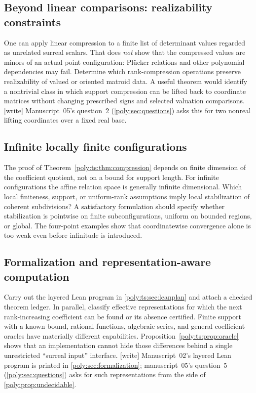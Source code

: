 \documentclass[11pt,a4paper]{article}
\numberwithin{equation}{section}
\theoremstyle{plain}
\newcommand{\wtag}{\textup{[write]}}%
\begin{document}
\subsection{Beyond linear comparisons: realizability constraints}
One can apply linear compression to a finite list of determinant values
regarded as unrelated surreal scalars. That does \emph{not} show that
the compressed values are minors of an actual point configuration:
Pl\"ucker relations and other polynomial dependencies may fail.
Determine which rank-compression operations preserve realizability of
valued or oriented matroid data. A useful theorem would identify a
nontrivial class in which support compression can be lifted back to
coordinate matrices without changing prescribed signs and selected
valuation comparisons.
\wtag{} Manuscript~05's question~2 (\cref{poly:sec:questions}) asks this for
two nonreal lifting coordinates over a fixed real base.

\subsection{Infinite locally finite configurations}
The proof of Theorem~\ref{poly:ts:thm:compression} depends on finite dimension of
the coefficient quotient, not on a bound for support length. For infinite
configurations the affine relation space is generally infinite dimensional.
Which local finiteness, support, or uniform-rank assumptions imply local
stabilization of coherent subdivisions? A satisfactory formulation should
specify whether stabilization is pointwise on finite subconfigurations,
uniform on bounded regions, or global. The four-point examples show that
coordinatewise convergence alone is too weak even before infinitude is
introduced.

\subsection{Formalization and representation-aware computation}
Carry out the layered Lean program in \cref{poly:ts:sec:leanplan} and
attach a checked theorem ledger. In parallel, classify effective
representations for which the next rank-increasing coefficient can be
found or its absence certified. Finite support with a known bound,
rational functions, algebraic series, and general coefficient oracles
have materially different capabilities. Proposition~\ref{poly:ts:prop:oracle}
shows that an implementation cannot hide those differences behind a
single unrestricted ``surreal input'' interface.
\wtag{} Manuscript~02's layered Lean program is printed in
\cref{poly:sec:formalization}; manuscript~05's question~5
(\cref{poly:sec:questions}) asks for such representations from the side of
\cref{poly:prop:undecidable}.
\end{document}
